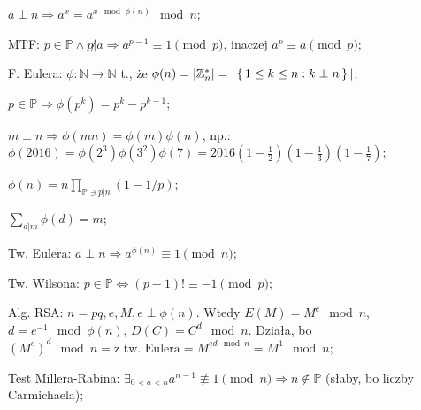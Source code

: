 $a \perp n \Rightarrow a^x = a^{x \mod \phi(n)} \mod n$;


MTF: ${p\in \mathbb{P} \land p\not | a} \Rightarrow a^{p-1} \equiv 1 \pmod{p}$,
  inaczej $a^p \equiv a \pmod{p}$;

F. Eulera: $\phi: \mathbb{N} \rightarrow \mathbb{N}$ t., że
  $\phi(n)=|\mathbb{Z}^*_n|=|\set{1\leq k\leq n : k \perp n}|$;

$p \in \mathbb{P} \Rightarrow \phi(p^k)=p^k-p^{k-1}$;

$m\perp n \Rightarrow \phi(mn) = \phi(m)\phi(n)$, np.:
  $\phi(2016) = \phi(2^3)\phi(3^2)\phi(7) =
  2016(1-\frac{1}{2})(1-\frac{1}{3})(1-\frac{1}{7})$;

$\phi(n) = n\prod_{\mathbb{P} \ni p | n}(1- 1/p)$;

$\sum_{d|m}\phi(d) = m$;

Tw. Eulera: $a\perp n \Rightarrow a^{\phi(n)} \equiv 1 \pmod{n}$;

Tw. Wilsona: $p\in\mathbb{P} \Leftrightarrow (p-1)! \equiv -1 \pmod{p}$;

Alg. RSA: $n=pq, e, M, e \perp \phi(n)$. Wtedy $E(M) = M^e \mod n$,
  $d = e^{-1} \mod \phi(n)$, $D(C) = C^d \mod n$. Działa, bo
  $(M^e)^d \mod n = \text{z tw. Eulera} = M^{ed \mod n} = M^1 \mod n$;

Test Millera-Rabina: $\exists_{0<a<n}a^{n-1}\not\equiv 1 \pmod{n} \Rightarrow
  n \not\in \mathbb{P}$ (słaby, bo liczby Carmichaela);



